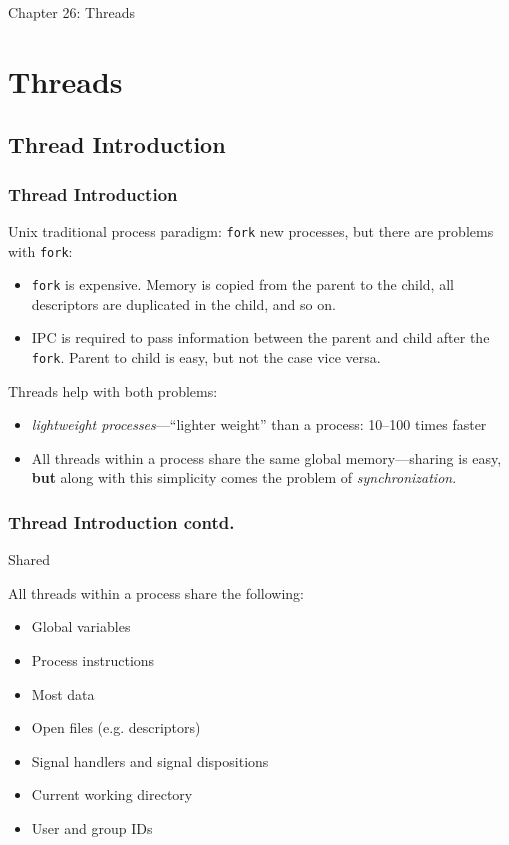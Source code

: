 \documentclass[notes,serif]{beamer}
\begin{document}
\begin{frame}
  \frametitle{}
  \begin{block}{}
    \begin{center}
    {\Large Chapter 26: Threads}      
    \end{center}
  \end{block}
\end{frame}

\section{Threads}
\subsection{Thread Introduction}
\begin{frame}
  \frametitle{Thread Introduction}
  Unix traditional process paradigm: \texttt{fork} new processes, but there are problems with \texttt{fork}:
  \begin{itemize}
    \item \texttt{fork} is expensive.  Memory is copied from the parent to the child, all descriptors are duplicated in the child, and so on.
    \item IPC is required to pass information between the parent and child after the \texttt{fork}.  Parent to child is easy, but not the case vice versa.
  \end{itemize}
  Threads help with both problems:
  \begin{itemize}
    \item \textit{lightweight processes}---``lighter weight'' than a process: 10--100 times faster
    \item All threads within a process share the same global memory---sharing is easy, \textbf{but} along with this simplicity comes the problem of \textit{synchronization}.
  \end{itemize}
\end{frame}

\begin{frame}
  \frametitle{Thread Introduction contd.}
  \begin{exampleblock}{Shared}
    {
    \small
    All threads within a process share the following:
  \begin{itemize}
    \item Global variables
    \item Process instructions
    \item Most data
    \item Open files (e.g. descriptors)
    \item Signal handlers and signal dispositions
    \item Current working directory
    \item User and group IDs
  \end{itemize}
  }
  \end{exampleblock}

\end{frame}
\end{document}

